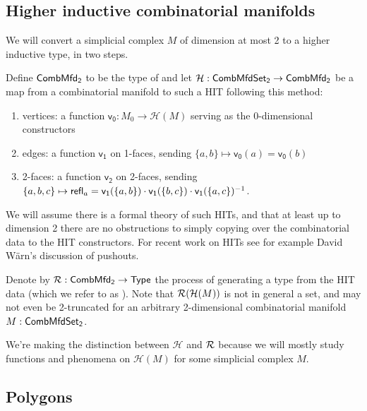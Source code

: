 \subsection{Higher inductive combinatorial manifolds}

We will convert a simplicial complex \( M \) of dimension at most 2 to a higher inductive type, in two steps. 

\begin{mydef}
Define \( \mathsf{CombMfd_2} \) to be the type of  and let \( \mathcal{H}:\mathsf{CombMfdSet_2}\to\mathsf{CombMfd_2} \) be a map from a combinatorial manifold to such a HIT following this method:
\begin{enumerate}
\item vertices: a function \( \mathsf{v_0}:M_0\to \mathcal{H}(M) \) serving as the 0-dimensional constructors
\item edges: a function \( \mathsf{v_1} \) on 1-faces, sending \( \{a, b\}\mapsto \mathsf{v_0}(a)=\mathsf{v_0}(b) \)
\item 2-faces: a function \( \mathsf{v_2} \) on 2-faces, sending \( \{a, b, c\}\mapsto \mathsf{refl}_a = \mathsf{v_1}(\{a, b\})\cdot \mathsf{v_1}(\{b, c\})\cdot \mathsf{v_1}(\{a, c\})^{-1} \).
\end{enumerate}
\end{mydef}

We will assume there is a formal theory of such HITs, and that at least up to dimension 2 there are no obstructions to simply copying over the combinatorial data to the HIT constructors. For recent work on HITs see for example David Wärn's discussion of pushouts\cite{warn_pushouts}.

\begin{mydef}
Denote by \( \mathcal{R}:\mathsf{CombMfd_2}\to\mathsf{Type} \) the process of generating a type from the HIT data (which we refer to as ). Note that \( \mathcal{R}(\mathcal{H}(M)) \) is not in general a set, and may not even be 2-truncated for an arbitrary 2-dimensional combinatorial manifold \( M:\mathsf{CombMfdSet_2} \).
\end{mydef}

We're making the distinction between \( \mathcal{H} \) and \( \mathcal{R} \) because we will mostly study functions and phenomena on \( \mathcal{H}(M) \) for some simplicial complex \( M \).

\subsection{Polygons}\label{sec:polygons}

